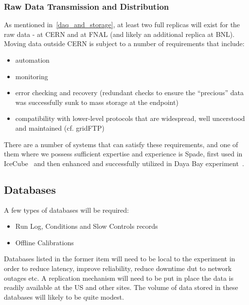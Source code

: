 \subsubsection{Raw Data Transmission and Distribution}
As mentioned in~\ref{daq_and_storage}, at least two full replicas will exist for the raw data - at CERN and at FNAL (and likely an additional replica at BNL). Moving data outside CERN
is subject to a number of requirements that include:
\begin{itemize}
\item automation
\item monitoring
\item error checking and recovery (redundant checks to ensure the ``precious'' data was successfully sunk to mass storage at the endpoint)
\item compatibility with lower-level protocols that are widespread, well uncerstood and maintained (cf. gridFTP)
\end{itemize}

There are a number of systems that can satisfy these requirements, and one of them where we possess sufficient expertise and experience is Spade, first used in IceCube~\cite{spade_icecube} and then enhanced and successfully utilized in Daya Bay experiment~\cite{spade_dayabay}.



\subsection{Databases}
A few types of databases will be required:
\begin{itemize}
\item Run Log, Conditions and Slow Controls records
\item Offline Calibrations
\end{itemize}

Databases listed in the former item will need to be local to the experiment in order to reduce latency, improve reliability, reduce downtime dut to
network outages etc.
A replication mechanism will need to be put in place the data is readily available at the US and other sites. The volume of data
stored in these databases will likely to be quite modest.

